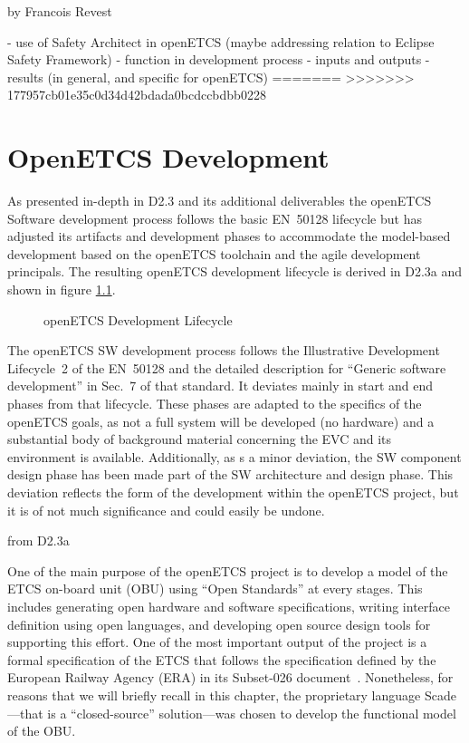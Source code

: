 \documentclass{template/openetcs_report}
\begin{document}
by Francois Revest

- use of Safety Architect in openETCS (maybe addressing relation to Eclipse Safety Framework)
- function in development process
- inputs and outputs
- results (in general, and specific for openETCS)
=======
>>>>>>> 177957cb01e35c0d34d42bdada0bcdccbdbb0228

\chapter{OpenETCS Development}
\label{sec:development-process}

As presented in-depth in D2.3 and its additional deliverables the openETCS Software development process follows the basic EN~50128 lifecycle but has adjusted its artifacts and development phases to accommodate the model-based development based on the openETCS toolchain and the agile development principals. The resulting openETCS development lifecycle is derived in D2.3a and shown in figure \ref{fig:lifecycle2}.

\begin{figure}[hbt]
  \centering
  \def\svgwidth{.9\textwidth}
  {\tiny
  }
  \caption{openETCS Development Lifecycle}
  \label{fig:lifecycle2}
\end{figure}



The openETCS SW development process follows the Illustrative
Development Lifecycle~2 \cite[Fig.~4]{EN50128:2011} of the EN~50128
and the detailed description for ``Generic software development'' in
Sec.~7 of that standard. It deviates mainly in start and end phases
from that lifecycle. These phases are adapted to the specifics of the
openETCS goals, as not a full system will be developed (no hardware)
and a substantial body of background material concerning the EVC and
its environment is available. Additionally, as s a minor deviation,
the SW component design phase has been made part of the SW
architecture and design phase. This deviation reflects the form of the
development within the openETCS project, but it is of not much
significance and could easily be undone.

from D2.3a


One of the main purpose of the openETCS project is to develop a model
of the ETCS on-board unit (OBU) using ``Open Standards'' at every
stages. This includes generating open hardware and software
specifications, writing interface definition using open languages, and
developing open source design tools for supporting this effort. One of
the most important output of the project is a formal specification of
the ETCS that follows the specification defined by the European
Railway Agency (ERA) in its Subset-026
document~\cite{subset-026}. Nonetheless, for reasons that we will
briefly recall in this chapter, the proprietary language Scade---that
is a ``closed-source'' solution---was chosen to develop the functional
model of the OBU.
\end{document}
